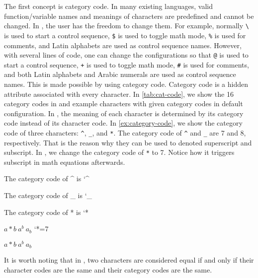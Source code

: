 \documentclass{ltugboat}
\begin{document}
The first concept is category code.
In many existing languages, valid function/variable names and meanings of characters are predefined and cannot be changed.
In \LT{}, the user has the freedom to change them.
For example, normally \verb|\| is used to start a control sequence, \verb|$| is used to toggle math mode, \verb|%| is used for comments, and Latin alphabets are used as control sequence names.
However, with several lines of code, one can change the configurations so that \verb|@| is used to start a control sequence, \verb|+| is used to toggle math mode, \verb|#| is used for comments, and both Latin alphabets and Arabic numerals are used as control sequence names.
This is made possible by using category code.
Category code is a hidden attribute associated with every character.
In \cref{tab:cat-code}, we show the 16 category codes in \LT{} and example characters with given category codes in default \LT{} configuration.
In \LT{}, the meaning of each character is determined by its category code instead of its character code. 
In \cref{ex:category-code}, we show the category code of three characters: \verb|^|, \verb|_|, and \verb|*|.
The category code of \verb|^| and \verb|_| are 7 and 8, respectively. 
That is the reason why they can be used to denoted superscript and subscript.
In , we change the category code of \verb|*| to 7.
Notice how it triggers subscript in math equations afterwards.
\begin{latexsample}[examplelabel={ex:category-code},exampletitle={Category Code}]
\par The category code of \^{} is \the\catcode`^
\par The category code of \_{} is \the\catcode`_
\par The category code of * is \the\catcode`*
\par $a*b~a^b~a_b$
\catcode`*=7
\par $a*b~a^b~a_b$
\end{latexsample}
\noindent 
It is worth noting that in \LT{}, two characters are considered equal if and only if their character codes are the same and their category codes are the same.
\end{document}
